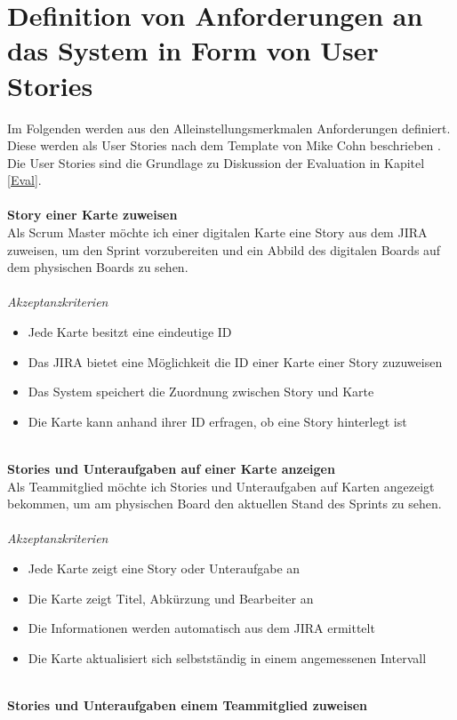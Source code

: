 \documentclass[12pt,titlepage]{scrartcl}
\begin{document}
	\section{Definition von Anforderungen an das System in Form von User Stories}
	Im Folgenden werden aus den Alleinstellungsmerkmalen Anforderungen definiert. Diese werden als User Stories nach dem Template von Mike Cohn beschrieben \cite{template}. Die User Stories sind die Grundlage zu Diskussion der Evaluation in Kapitel \ref{Eval}. \\ \\
	\textbf{Story einer Karte zuweisen} \\
	Als Scrum Master möchte ich einer digitalen Karte eine Story aus dem JIRA zuweisen, um den Sprint vorzubereiten und ein Abbild des digitalen Boards auf dem physischen Boards zu sehen. \\ \\
	\textit{Akzeptanzkriterien}
	\begin{itemize}
		\setlength\itemsep{0em}
		\item Jede Karte besitzt eine eindeutige ID
		\item Das JIRA bietet eine Möglichkeit die ID einer Karte einer Story zuzuweisen
		\item Das System speichert die Zuordnung zwischen Story und Karte
		\item Die Karte kann anhand ihrer ID erfragen, ob eine Story hinterlegt ist
	\end{itemize}
	\noindent
	\\ \textbf{Stories und Unteraufgaben auf einer Karte anzeigen} \\
	Als Teammitglied möchte ich Stories und Unteraufgaben auf Karten angezeigt bekommen, um am physischen Board den aktuellen Stand des Sprints zu sehen. \\ \\
	\textit{Akzeptanzkriterien}
	\begin{itemize}
		\setlength\itemsep{0em}
		\item Jede Karte zeigt eine Story oder Unteraufgabe an
		\item Die Karte zeigt Titel, Abkürzung und Bearbeiter an
		\item Die Informationen werden automatisch aus dem JIRA ermittelt
		\item Die Karte aktualisiert sich selbstständig in einem angemessenen Intervall
	\end{itemize}
	\noindent
	\\ \textbf{Stories und Unteraufgaben einem Teammitglied zuweisen} \\
\end{document}
